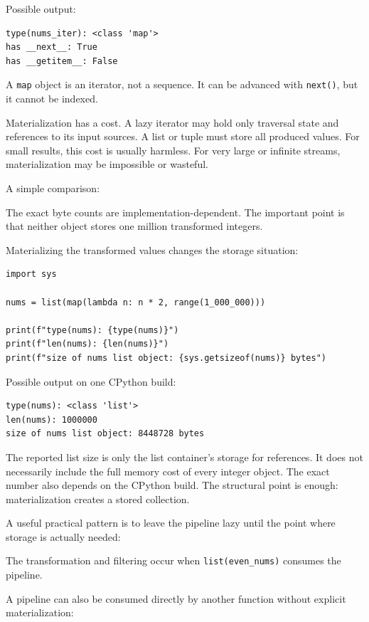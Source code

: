 Possible output:

\begin{verbatim}
type(nums_iter): <class 'map'>
has __next__: True
has __getitem__: False
\end{verbatim}

A \texttt{map} object is an iterator, not a sequence. It can be advanced with \texttt{next()}, but it cannot be indexed.

Materialization has a cost. A lazy iterator may hold only traversal state and references to its input sources. A list or tuple must store all produced values. For small results, this cost is usually harmless. For very large or infinite streams, materialization may be impossible or wasteful.

A simple comparison:

The exact byte counts are implementation-dependent. The important point is that neither object stores one million transformed integers.

Materializing the transformed values changes the storage situation:

\begin{verbatim}
import sys

nums = list(map(lambda n: n * 2, range(1_000_000)))

print(f"type(nums): {type(nums)}")
print(f"len(nums): {len(nums)}")
print(f"size of nums list object: {sys.getsizeof(nums)} bytes")
\end{verbatim}

Possible output on one CPython build:

\begin{verbatim}
type(nums): <class 'list'>
len(nums): 1000000
size of nums list object: 8448728 bytes
\end{verbatim}

The reported list size is only the list container's storage for references. It does not necessarily include the full memory cost of every integer object. The exact number also depends on the CPython build. The structural point is enough: materialization creates a stored collection.

A useful practical pattern is to leave the pipeline lazy until the point where storage is actually needed:



The transformation and filtering occur when \texttt{list(even\_nums)} consumes the pipeline.

A pipeline can also be consumed directly by another function without explicit materialization:

